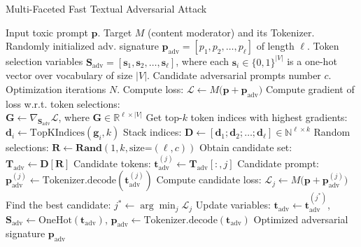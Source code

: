 \begin{algorithm}[tbp]
  \caption{Multi-Faceted Fast Textual Adversarial Attack}
  \label{alg:multifaceted_fast_prompt_attack}
  {\footnotesize 
  \begin{algorithmic}[1]
    \Require
      Input toxic prompt $\mathbf{p}$.
      Target $M$ (\ie content moderator) and its Tokenizer.
      Randomly initialized adv. signature $\mathbf{p}_{\text{adv}} = [p_1, p_2, \dots, p_\ell]$ of length $\ell$.
      Token selection variables $\mathbf{S}_{\text{adv}} = [\mathbf{s}_1, \mathbf{s}_2, \dots, \mathbf{s}_\ell]$, where each $\mathbf{s}_i \in \{0,1\}^{|V|}$ is a one-hot vector over vocabulary of size $|V|$.
      Candidate adversarial prompts number $c$.
      Optimization iterations $N$.
     
      \State Compute loss: $\mathcal{L} \leftarrow M\big(\mathbf{p} + \mathbf{p}_{\text{adv}}\big)$
      \State Compute gradient of loss w.r.t. token selections:
      \\\hspace{1.5em} $\mathbf{G} \leftarrow \nabla_{\mathbf{S}_{\text{adv}}} \mathcal{L}$, where $\mathbf{G} \in \mathbb{R}^{\ell \times |V|}$
         
          \State Get top-$k$ token indices with highest gradients: 
          \State $\mathbf{d}_i \leftarrow \text{TopKIndices}(\mathbf{g}_i, k)$
        \EndFor
        \State Stack indices: $\mathbf{D} \leftarrow [\mathbf{d}_1; \mathbf{d}_2; \dots; \mathbf{d}_\ell] \in \mathbb{N}^{\ell \times k}$
        \State Random selections: $\mathbf{R} \leftarrow \textbf{Rand}(1, k, \text{size=}(\ell, c))$
        \State Obtain candidate set: $\mathbf{T}_{\text{adv}} \leftarrow \mathbf{D}[\mathbf{R}]$
         
          \State Candidate tokens: $\mathbf{t}_{\text{adv}}^{(j)} \leftarrow \mathbf{T}_{\text{adv}}[:, j]$
          \State Candidate prompt: $\mathbf{p}_{\text{adv}}^{(j)} \leftarrow \text{Tokenizer.decode}(\mathbf{t}_{\text{adv}}^{(j)})$
          \State Compute candidate loss: $\mathcal{L}_j \leftarrow M\big(\mathbf{p} + \mathbf{p}_{\text{adv}}^{(j)}\big)$
        \EndFor
        \State Find the best candidate: $j^* \leftarrow \arg\min_{j} \mathcal{L}_j$
        \State Update variables: $\mathbf{t}_{\text{adv}} \leftarrow \mathbf{t}_{\text{adv}}^{(j^*)}$, $\mathbf{S}_{\text{adv}} \leftarrow \text{OneHot}(\mathbf{t}_{\text{adv}})$, $\mathbf{p}_{\text{adv}} \leftarrow \text{Tokenizer.decode}(\mathbf{t}_{\text{adv}})$
    \EndFor
    \Ensure Optimized adversarial signature $\mathbf{p}_{\text{adv}}$
  \end{algorithmic}}
\end{algorithm}